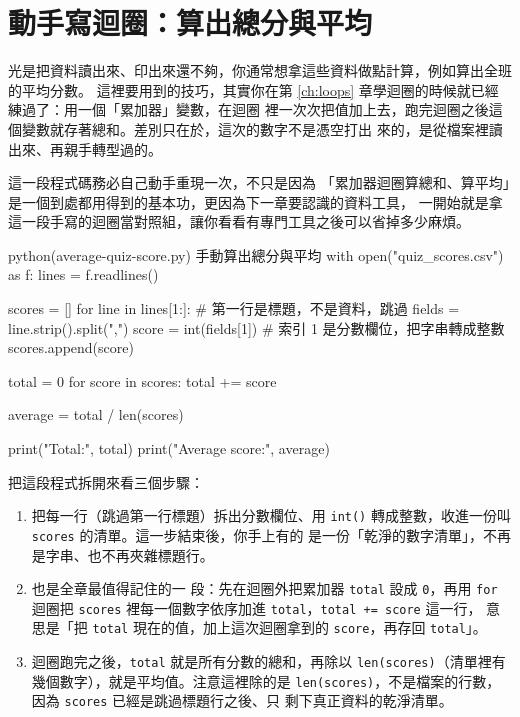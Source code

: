 \section{動手寫迴圈：算出總分與平均}
\label{sec:csv-manual-average}

光是把資料讀出來、印出來還不夠，你通常想拿這些資料做點計算，例如算出全班的平均分數。
這裡要用到的技巧，其實你在第 \ref{ch:loops} 章學迴圈的時候就已經練過了：用一個「累加器」變數，在迴圈
裡一次次把值加上去，跑完迴圈之後這個變數就存著總和。差別只在於，這次的數字不是憑空打出
來的，是從檔案裡讀出來、再親手轉型過的。

這一段程式碼務必自己動手重現一次，不只是因為
「累加器迴圈算總和、算平均」是一個到處都用得到的基本功，更因為下一章要認識的資料工具，
一開始就是拿這一段手寫的迴圈當對照組，讓你看看有專門工具之後可以省掉多少麻煩。

\begin{example}{python}{(average-quiz-score.py) 手動算出總分與平均}
with open("quiz_scores.csv") as f:
    lines = f.readlines()

scores = []
for line in lines[1:]:                      # 第一行是標題，不是資料，跳過
    fields = line.strip().split(",")
    score = int(fields[1])                   # 索引 1 是分數欄位，把字串轉成整數
    scores.append(score)

total = 0
for score in scores:
    total += score

average = total / len(scores)

print("Total:", total)
print("Average score:", average)
\end{example}


把這段程式拆開來看三個步驟：

\begin{enumerate}
\item 把每一行（跳過第一行標題）拆出分數欄位、用
\texttt{int()} 轉成整數，收進一份叫 \texttt{scores} 的清單。這一步結束後，你手上有的
是一份「乾淨的數字清單」，不再是字串、也不再夾雜標題行。
\item 也是全章最值得記住的一
段：先在迴圈外把累加器 \texttt{total} 設成 \texttt{0}，再用 \texttt{for} 迴圈把
\texttt{scores} 裡每一個數字依序加進 \texttt{total}，\texttt{total += score} 這一行，
意思是「把 \texttt{total} 現在的值，加上這次迴圈拿到的 \texttt{score}，再存回
\texttt{total}」。
\item 迴圈跑完之後，\texttt{total} 就是所有分數的總和，再除以
\texttt{len(scores)}（清單裡有幾個數字），就是平均值。注意這裡除的是
\texttt{len(scores)}，不是檔案的行數，因為 \texttt{scores} 已經是跳過標題行之後、只
剩下真正資料的乾淨清單。
\end{enumerate}

